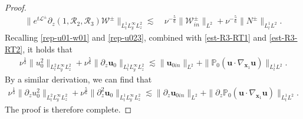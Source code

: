 \documentclass[11pt,reqno]{article}
\numberwithin{equation}{section}
\newcommand\Z{{\mathbb Z}}
\newcommand\PP{{\mathbb P}}
\newcommand\W{{\mathcal W}}
\newcommand\x{\bm{x}}
\newcommand\uu{\bm{u}}
\let\pa=\partial
\let\f=\frac
\def \cR {\mathcal{R}}
\begin{document}
\begin{proof}
\begin{align}
        \| e^{t \mathcal{L}^{\pm}} \pa_z(1,\cR_2,\cR_3)\W^{\pm} \|_{L^1_t L^{\infty}_yL^2_z}     
        \lesssim &~
        \nu^{-\f56}\|\W^{\pm}_{in}\|_{L^2}+\nu^{-\f56}\|N^{\pm}\|_{L^1_tL^2}.
    \end{align}
    Recalling \eqref{rep-u01-w01} and \eqref{rep-u023}, combined with \eqref{est-R3-RT1} and \eqref{est-R3-RT2}, it holds that
         \begin{align*}
        \nu^{\f13}\|u_0^2\|_{L^2_t L^{\infty}_yL^2_z}
        +\nu^{\f56}\|\pa_z\uu_0\|_{L^1_t L^{\infty}_yL^2_z}
        \lesssim    \|\uu_{0in}\|_{L^2}+\|\PP_0(\uu\cdot\nabla_{\x_1}  \uu)\|_{L^1_tL^2}.
    \end{align*}
    By a similar derivation, we can find that
    \begin{align*}
        \nu^{\f13}\|\pa_zu_0^2\|_{L^2_t L^{\infty}_yL^2_z}
        +\nu^{\f56}\|\pa_z^2\uu_0\|_{L^1_t L^{\infty}_yL^2_z}
        \lesssim 
        \|\pa_z\uu_{0in}\|_{L^2}+\|\pa_z\PP_0(\uu\cdot\nabla_{\x_1}  \uu)\|_{L^1_tL^2}.
    \end{align*}
    The proof is therefore complete.
\end{proof}
\end{document}
